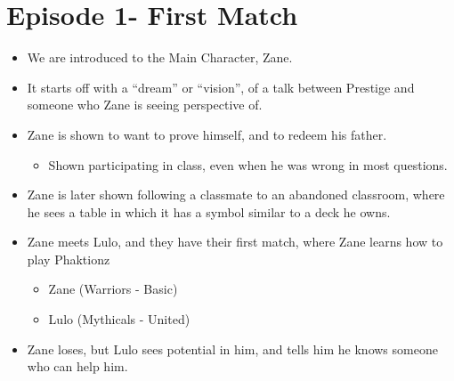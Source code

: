 \documentclass[12pt, letterpaper]{article}
\begin{document}
\section*{Episode 1- First Match}
\begin{itemize}
    \item We are introduced to the Main Character, Zane.
    \item It starts off with a “dream” or “vision”, of a talk between Prestige and someone who Zane is seeing perspective of.
    \item Zane is shown to want to prove himself, and to redeem his father. 
    \begin{itemize}
        \item Shown participating in class, even when he was wrong in most questions.
    \end{itemize}
    \item Zane is later shown following a classmate to an abandoned classroom, where he sees a table in which it has a symbol similar to a deck he owns.
    \item Zane meets Lulo, and they have their first match, where Zane learns how to play Phaktionz
    \begin{itemize}
        \item Zane (Warriors - Basic)
        \item Lulo (Mythicals - United)
    \end{itemize}
    \item Zane loses, but Lulo sees potential in him, and tells him he knows someone who can help him.
\end{itemize}
\end{document}
